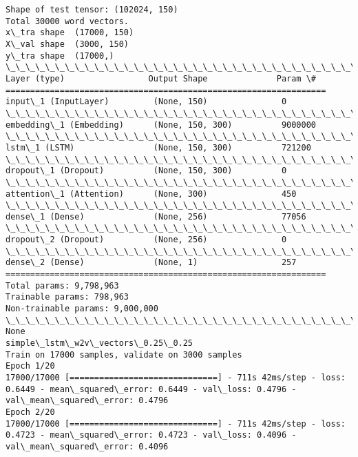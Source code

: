 \documentclass[11pt]{article}
\begin{document}
    \begin{Verbatim}[commandchars=\\\{\}]
Shape of test tensor: (102024, 150)
Total 30000 word vectors.
x\_tra shape  (17000, 150)
X\_val shape  (3000, 150)
y\_tra shape  (17000,)
\_\_\_\_\_\_\_\_\_\_\_\_\_\_\_\_\_\_\_\_\_\_\_\_\_\_\_\_\_\_\_\_\_\_\_\_\_\_\_\_\_\_\_\_\_\_\_\_\_\_\_\_\_\_\_\_\_\_\_\_\_\_\_\_\_
Layer (type)                 Output Shape              Param \#   
=================================================================
input\_1 (InputLayer)         (None, 150)               0         
\_\_\_\_\_\_\_\_\_\_\_\_\_\_\_\_\_\_\_\_\_\_\_\_\_\_\_\_\_\_\_\_\_\_\_\_\_\_\_\_\_\_\_\_\_\_\_\_\_\_\_\_\_\_\_\_\_\_\_\_\_\_\_\_\_
embedding\_1 (Embedding)      (None, 150, 300)          9000000   
\_\_\_\_\_\_\_\_\_\_\_\_\_\_\_\_\_\_\_\_\_\_\_\_\_\_\_\_\_\_\_\_\_\_\_\_\_\_\_\_\_\_\_\_\_\_\_\_\_\_\_\_\_\_\_\_\_\_\_\_\_\_\_\_\_
lstm\_1 (LSTM)                (None, 150, 300)          721200    
\_\_\_\_\_\_\_\_\_\_\_\_\_\_\_\_\_\_\_\_\_\_\_\_\_\_\_\_\_\_\_\_\_\_\_\_\_\_\_\_\_\_\_\_\_\_\_\_\_\_\_\_\_\_\_\_\_\_\_\_\_\_\_\_\_
dropout\_1 (Dropout)          (None, 150, 300)          0         
\_\_\_\_\_\_\_\_\_\_\_\_\_\_\_\_\_\_\_\_\_\_\_\_\_\_\_\_\_\_\_\_\_\_\_\_\_\_\_\_\_\_\_\_\_\_\_\_\_\_\_\_\_\_\_\_\_\_\_\_\_\_\_\_\_
attention\_1 (Attention)      (None, 300)               450       
\_\_\_\_\_\_\_\_\_\_\_\_\_\_\_\_\_\_\_\_\_\_\_\_\_\_\_\_\_\_\_\_\_\_\_\_\_\_\_\_\_\_\_\_\_\_\_\_\_\_\_\_\_\_\_\_\_\_\_\_\_\_\_\_\_
dense\_1 (Dense)              (None, 256)               77056     
\_\_\_\_\_\_\_\_\_\_\_\_\_\_\_\_\_\_\_\_\_\_\_\_\_\_\_\_\_\_\_\_\_\_\_\_\_\_\_\_\_\_\_\_\_\_\_\_\_\_\_\_\_\_\_\_\_\_\_\_\_\_\_\_\_
dropout\_2 (Dropout)          (None, 256)               0         
\_\_\_\_\_\_\_\_\_\_\_\_\_\_\_\_\_\_\_\_\_\_\_\_\_\_\_\_\_\_\_\_\_\_\_\_\_\_\_\_\_\_\_\_\_\_\_\_\_\_\_\_\_\_\_\_\_\_\_\_\_\_\_\_\_
dense\_2 (Dense)              (None, 1)                 257       
=================================================================
Total params: 9,798,963
Trainable params: 798,963
Non-trainable params: 9,000,000
\_\_\_\_\_\_\_\_\_\_\_\_\_\_\_\_\_\_\_\_\_\_\_\_\_\_\_\_\_\_\_\_\_\_\_\_\_\_\_\_\_\_\_\_\_\_\_\_\_\_\_\_\_\_\_\_\_\_\_\_\_\_\_\_\_
None
simple\_lstm\_w2v\_vectors\_0.25\_0.25
Train on 17000 samples, validate on 3000 samples
Epoch 1/20
17000/17000 [==============================] - 711s 42ms/step - loss: 0.6449 - mean\_squared\_error: 0.6449 - val\_loss: 0.4796 - val\_mean\_squared\_error: 0.4796
Epoch 2/20
17000/17000 [==============================] - 711s 42ms/step - loss: 0.4723 - mean\_squared\_error: 0.4723 - val\_loss: 0.4096 - val\_mean\_squared\_error: 0.4096

\end{Verbatim}
\end{document}

